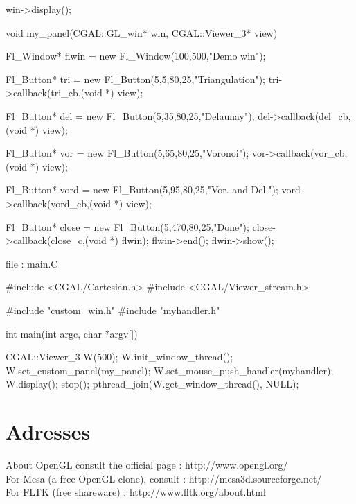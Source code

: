 \begin{cprog}
{  win->display();
}




void my_panel(CGAL::GL_win* win, CGAL::Viewer_3* view)
{


 Fl_Window* flwin = new Fl_Window(100,500,"Demo win");

 Fl_Button* tri = new Fl_Button(5,5,80,25,"Triangulation");
 tri->callback(tri_cb,(void *) view);

 Fl_Button* del = new Fl_Button(5,35,80,25,"Delaunay");
 del->callback(del_cb,(void *) view);

 
 Fl_Button* vor = new Fl_Button(5,65,80,25,"Voronoi");
 vor->callback(vor_cb,(void *) view);

 Fl_Button* vord = new Fl_Button(5,95,80,25,"Vor. and Del.");
 vord->callback(vord_cb,(void *) view);


 Fl_Button* close = new Fl_Button(5,470,80,25,"Done");
 close->callback(close_c,(void *) flwin);
    flwin->end();
    flwin->show();

}

\end{cprog}
file : main.C
\begin{cprog}
#include <CGAL/Cartesian.h>
#include <CGAL/Viewer_stream.h>

#include "custom_win.h"
#include "myhandler.h"

int main(int argc, char *argv[]) 
{

  CGAL::Viewer_3 W(500);
  W.init_window_thread();
  W.set_custom_panel(my_panel);
  W.set_mouse_push_handler(myhandler);
  W.display();
  stop();
  pthread_join(W.get_window_thread(), NULL);
}

\end{cprog}

\section{Adresses}

About OpenGL consult the official page : http://www.opengl.org/ \\
For Mesa (a free OpenGL clone), consult :
http://mesa3d.sourceforge.net/ \\
For FLTK (free shareware) : http://www.fltk.org/about.html


